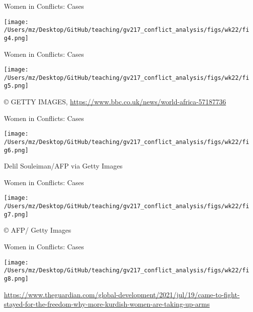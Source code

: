 \documentclass{beamer}
\begin{document}
\begin{frame}{Women in Conflicts: Cases}
    \pause
    \begin{center}
        \texttt{[image: /Users/mz/Desktop/GitHub/teaching/gv217\_conflict\_analysis/figs/wk22/fig4.png]}
    \end{center}
\end{frame}

\begin{frame}{Women in Conflicts: Cases}
    \pause
    \begin{center}
        \texttt{[image: /Users/mz/Desktop/GitHub/teaching/gv217\_conflict\_analysis/figs/wk22/fig5.png]}
    \end{center}
    \tiny © GETTY IMAGES, \url{https://www.bbc.co.uk/news/world-africa-57187736}
\end{frame}

\begin{frame}{Women in Conflicts: Cases}
    \pause
    \begin{center}
        \texttt{[image: /Users/mz/Desktop/GitHub/teaching/gv217\_conflict\_analysis/figs/wk22/fig6.png]}
    \end{center}
    \tiny Delil Souleiman/AFP via Getty Images
\end{frame}

\begin{frame}{Women in Conflicts: Cases}
    \pause
    \begin{center}
        \texttt{[image: /Users/mz/Desktop/GitHub/teaching/gv217\_conflict\_analysis/figs/wk22/fig7.png]}
    \end{center}
    \tiny © AFP/ Getty Images
\end{frame}

\begin{frame}{Women in Conflicts: Cases}
    \pause
    \begin{center}
        \texttt{[image: /Users/mz/Desktop/GitHub/teaching/gv217\_conflict\_analysis/figs/wk22/fig8.png]}
    \end{center}
    \tiny \url{https://www.theguardian.com/global-development/2021/jul/19/came-to-fight-stayed-for-the-freedom-why-more-kurdish-women-are-taking-up-arms}
\end{frame}
\end{document}
